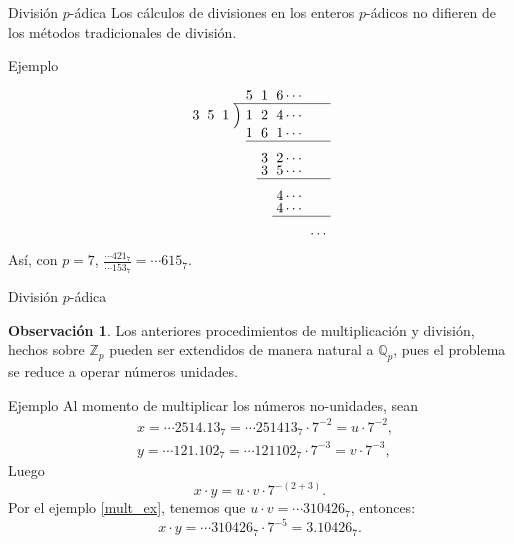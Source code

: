 \documentclass{beamer}
\theoremstyle{definition}
\numberwithin{equation}{section}
\newcommand{\redd}[1]{\textcolor{rkColor}{#1}}
\newtheorem{rr}{\redd{Observación}}
\newcommand{\Qp}{\mathbb{Q}_p}
\newcommand{\Zp}{\mathbb{Z}_p}
\begin{document}
\begin{frame}{División $p$-ádica}
	Los cálculos de divisiones en los enteros $p$-ádicos no difieren de los métodos tradicionales de división.
	\begin{exampleblock}{Ejemplo}
		
		\begin{align*}
		\renewcommand\arraystretch{.75}\renewcommand\arraycolsep{3pt}
		\begin{array}{r@{\hskip\arraycolsep}c@{\hskip\arraycolsep}l*5r} %
		&&5&1&6\cdots\\
		\cline{2-6} %
		3\hspace{2mm} 5\hspace{2mm} 1&\Big)&1&2&4\cdots \\
		&&1&6&1\cdots \\
		\cline{3-6}\\
		&&&3&2\cdots\\
		&&&3&5\cdots\\
		\cline{4-6}\\
		&&&&4\cdots\\
		&&&&4\cdots\\
		\cline{5-6}\\
		&&&&&\cdots\\
		\end{array}
		\end{align*}
		Así, con $p=7$, $\frac{\cdots421_7}{\cdots153_7}=\cdots 615_7$.
	\end{exampleblock}
\end{frame}

\begin{frame}{División $p$-ádica}
\begin{rr}
	Los anteriores procedimientos de multiplicación y división, hechos sobre $\Zp$ pueden ser extendidos de manera natural a $\Qp$, pues el problema se reduce a operar números unidades.
\end{rr}
\newpage
\begin{exampleblock}{Ejemplo}
	Al momento de multiplicar los números no-unidades, sean 
	\begin{align*}
	&x = \cdots2514.13_7= \cdots251413_7\cdot 7^{-2}=u\cdot 7^{-2},\\
	&y=\cdots 121.102_7=\cdots 121102_7\cdot 7^{-3}=v\cdot 7^{-3},
	\end{align*}
	Luego $$x\cdot y = u\cdot v \cdot 7^{- (2+3)}.$$
	Por el ejemplo \ref{mult_ex}, tenemos que $u\cdot v = \cdots 310426_7$, entonces:
	$$x\cdot y = \cdots 310426_7\cdot 7^{-5}=3.10426_7.$$

	
\end{exampleblock}
\end{frame}
\end{document}
